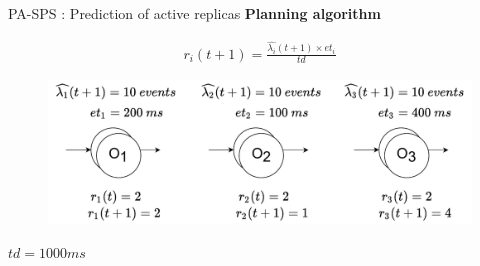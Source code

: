 \begin{frame}{PA-SPS : Prediction of active replicas}
	\textbf{Planning algorithm}
	\begin{center}
	\begin{align*}
		r_i(t+1) = \frac{\widehat{\lambda_i}(t+1) \times et_i}{td}
	\end{align*}

    \begin{figure}
    \includegraphics[scale=0.5]{images/concepts/predictive/PA-SPS-PredictiveModel.pdf}
    \end{figure}

    $td = 1000 ms$
   	\end{center}
\end{frame}